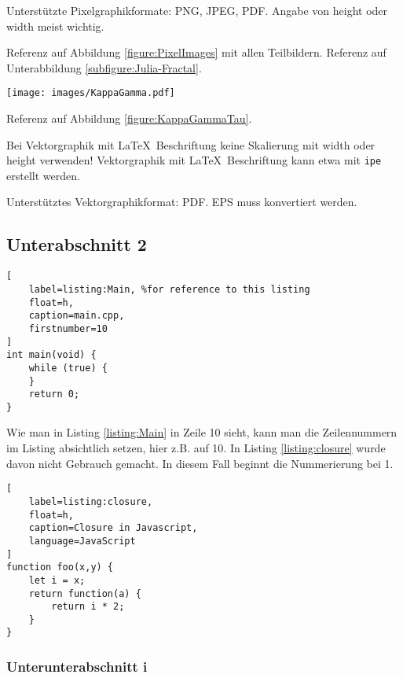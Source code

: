 Unterstützte Pixelgraphikformate: PNG, JPEG, PDF.
Angabe von height oder width meist wichtig.

Referenz auf Abbildung \ref{figure:PixelImages} mit allen Teilbildern.
Referenz auf Unterabbildung \ref{subfigure:Julia-Fractal}.

\begin{figure*}[t]
	\centering
	\texttt{[image: images/KappaGamma.pdf]}
	\caption{
		Vektorgraphik mit \LaTeX\ Beschriftung ($\kappa$, $\gamma$)
	}
	\label{figure:KappaGammaTau}
\end{figure*}

Referenz auf Abbildung \ref{figure:KappaGammaTau}.

Bei Vektorgraphik mit \LaTeX\ Beschriftung keine Skalierung mit width
oder height verwenden!
Vektorgraphik mit \LaTeX\ Beschriftung kann etwa mit \texttt{ipe} erstellt
werden.

Unterstütztes Vektorgraphikformat: PDF. EPS muss konvertiert werden.


\subsection{Unterabschnitt 2}
\label{subsection:Coding}

\begin{lstlisting}[
	label=listing:Main, %for reference to this listing
	float=h,
	caption=main.cpp,
	firstnumber=10
]
int main(void) {
	while (true) {
	}
	return 0;
}
\end{lstlisting}

Wie man in Listing \ref{listing:Main} in Zeile 10 sieht, kann man die Zeilennummern im Listing absichtlich setzen, hier z.B. auf 10. In Listing \ref{listing:closure} wurde davon nicht Gebrauch gemacht. In diesem Fall beginnt die Nummerierung bei 1.

\begin{lstlisting}[
    label=listing:closure,
	float=h,
	caption=Closure in Javascript,
	language=JavaScript
]
function foo(x,y) {
    let i = x;
    return function(a) {
        return i * 2;
    }
}
\end{lstlisting}


\subsubsection{Unterunterabschnitt i}

